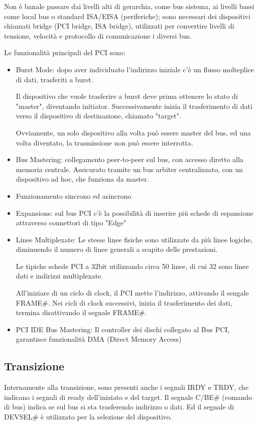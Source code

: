 \documentclass[../template]{subfiles}
\begin{document}
Non è banale passare dai livelli alti di gerarchia, come bus sistema, ai livelli bassi come local bus o standard ISA/EISA (periferiche); sono necessari dei dispositivi chiamati bridge (PCI bridge, ISA bridge), utilizzati per convertire livelli di tensione, velocità e protocollo di comunicazione i diversi bus.

Le funzionalità principali del PCI sono:
\begin{itemize}
    \item Burst Mode: dopo aver individuato l'indirizzo iniziale c'è un flusso molteplice di dati, trasferiti a burst.

        Il dispositivo che vuole trasferire a burst deve prima ottenere lo stato di "master", diventando initiator. Successivamente inizia il trasferimento di dati verso il dispositivo di destinazione, chiamato "target".

        Ovviamente, un solo dispositivo alla volta può essere master del bus, ed una volta diventato, la trasmissione non può essere interrotta.

    \item Bus Mastering: collegamento peer-to-peer sul bus, con accesso diretto alla memoria centrale. Assicurato tramite un bus arbiter centralizzato, con un dispositivo ad hoc, che funziona da master.
    \item Funzionamento sincrono ed asincrono
    \item Expansions: sul bus PCI c'è la possibilità di inserire più schede di espansione attraverso connettori di tipo "Edge"
    \item Linee Multiplexate: Le stesse linee fisiche sono utilizzate da più linee logiche, diminuendo il numero di linee generali a scapito delle prestazioni.

        Le tipiche schede PCI a 32bit utilizzando circa 50 linee, di cui 32 sono linee dati e indirizzi multiplexate.

        All'iniziare di un ciclo di clock, il PCI mette l'indirizzo, attivando il sengale FRAME\#.
        Nei cicli di clock successivi, inizia il trasferimento dei dati, termina disattivando il segnale FRAME\#.

    \item PCI IDE Bus Mastering: Il controller dei dischi collegato al Bus PCI, garantisce funzionalità DMA (Direct Memory Access)
\end{itemize}

\subsection{Transizione}
Internamente alla transizione, sono presenti anche i segnali IRDY e TRDY, che indicano i segnali di ready dell'iniziato e del target.
Il segnale C/BE\# (comando di bus) indica se sul bus si sta trasferendo indirizzo o dati.
Ed il segnale di DEVSEL\# è utilizzato per la selezione del dispositivo.
\end{document}
